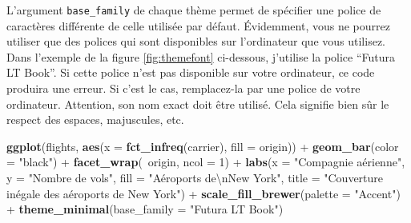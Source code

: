 \documentclass[a4paperpaper,]{article}
\newenvironment{Shaded}{\begin{snugshade}}{\end{snugshade}}
\newcommand{\CharTok}[1]{\textcolor[rgb]{0.57,0.30,0.62}{#1}}
\newcommand{\DataTypeTok}[1]{\textcolor[rgb]{0.00,0.34,0.68}{#1}}
\newcommand{\DecValTok}[1]{\textcolor[rgb]{0.69,0.50,0.00}{#1}}
\newcommand{\KeywordTok}[1]{\textcolor[rgb]{0.12,0.11,0.11}{\textbf{#1}}}
\newcommand{\NormalTok}[1]{\textcolor[rgb]{0.12,0.11,0.11}{#1}}
\newcommand{\OperatorTok}[1]{\textcolor[rgb]{0.12,0.11,0.11}{#1}}
\newcommand{\StringTok}[1]{\textcolor[rgb]{0.75,0.01,0.01}{#1}}
\begin{document}
L'argument \texttt{base\_family} de chaque thème permet de spécifier une police de caractères différente de celle utilisée par défaut. Évidemment, vous ne pourrez utiliser que des polices qui sont disponibles sur l'ordinateur que vous utilisez. Dans l'exemple de la figure \ref{fig:themefont} ci-dessous, j'utilise la police ``Futura LT Book''. Si cette police n'est pas disponible sur votre ordinateur, ce code produira une erreur. Si c'est le cas, remplacez-la par une police de votre ordinateur. Attention, son nom exact doit être utilisé. Cela signifie bien sûr le respect des espaces, majuscules, etc.

\begin{Shaded}
\begin{Highlighting}[]
\KeywordTok{ggplot}\NormalTok{(flights, }\KeywordTok{aes}\NormalTok{(}\DataTypeTok{x =} \KeywordTok{fct_infreq}\NormalTok{(carrier), }\DataTypeTok{fill =}\NormalTok{ origin)) }\OperatorTok{+}
\StringTok{  }\KeywordTok{geom_bar}\NormalTok{(}\DataTypeTok{color =} \StringTok{"black"}\NormalTok{) }\OperatorTok{+}
\StringTok{  }\KeywordTok{facet_wrap}\NormalTok{(}\OperatorTok{~}\NormalTok{origin, }\DataTypeTok{ncol =} \DecValTok{1}\NormalTok{) }\OperatorTok{+}
\StringTok{  }\KeywordTok{labs}\NormalTok{(}\DataTypeTok{x =} \StringTok{"Compagnie aérienne"}\NormalTok{,}
       \DataTypeTok{y =} \StringTok{"Nombre de vols"}\NormalTok{,}
       \DataTypeTok{fill =} \StringTok{"Aéroports de}\CharTok{\textbackslash{}n}\StringTok{New York"}\NormalTok{,}
       \DataTypeTok{title =} \StringTok{"Couverture inégale des aéroports de New York"}\NormalTok{) }\OperatorTok{+}
\StringTok{  }\KeywordTok{scale_fill_brewer}\NormalTok{(}\DataTypeTok{palette =} \StringTok{"Accent"}\NormalTok{) }\OperatorTok{+}
\StringTok{  }\KeywordTok{theme_minimal}\NormalTok{(}\DataTypeTok{base_family =} \StringTok{"Futura LT Book"}\NormalTok{)}
\end{Highlighting}
\end{Shaded}
\end{document}
